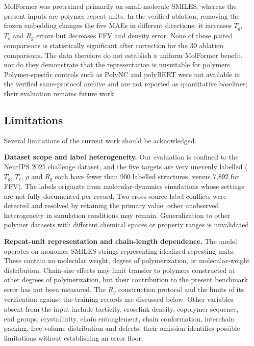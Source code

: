 \documentclass{article}
\begin{document}
MolFormer was pretrained primarily on small-molecule SMILES, whereas the present inputs are polymer repeat units. In the verified ablation, removing the frozen embedding changes the five MAEs in different directions: it increases $T_g$, $T_c$ and $R_g$ errors but decreases FFV and density error. None of these paired comparisons is statistically significant after correction for the 30 ablation comparisons. The data therefore do not establish a uniform MolFormer benefit, nor do they demonstrate that the representation is unsuitable for polymers. Polymer-specific controls such as PolyNC and polyBERT were not available in the verified same-protocol archive and are not reported as quantitative baselines; their evaluation remains future work.

\subsection{Limitations}
\label{sec:limitations}

Several limitations of the current work should be acknowledged.

\textbf{Dataset scope and label heterogeneity.} Our evaluation is confined to the NeurIPS 2025 challenge dataset, and the five targets are very unevenly labelled ($T_g$, $T_c$, $\rho$ and $R_g$ each have fewer than 900 labelled structures, versus 7{,}892 for FFV). The labels originate from molecular-dynamics simulations whose settings are not fully documented per record. Two cross-source label conflicts were detected and resolved by retaining the primary value; other unobserved heterogeneity in simulation conditions may remain. Generalization to other polymer datasets with different chemical spaces or property ranges is unvalidated.

\textbf{Repeat-unit representation and chain-length dependence.} The model operates on monomer SMILES strings representing idealized repeating units. These contain no molecular weight, degree of polymerization, or molecular-weight distribution. Chain-size effects may limit transfer to polymers constructed at other degrees of polymerization, but their contribution to the present benchmark error has not been measured. The $R_g$ construction protocol and the limits of its verification against the training records are discussed below. Other variables absent from the input include tacticity, crosslink density, copolymer sequence, end groups, crystallinity, chain entanglement, chain conformation, interchain packing, free-volume distribution and defects; their omission identifies possible limitations without establishing an error floor.
\end{document}
